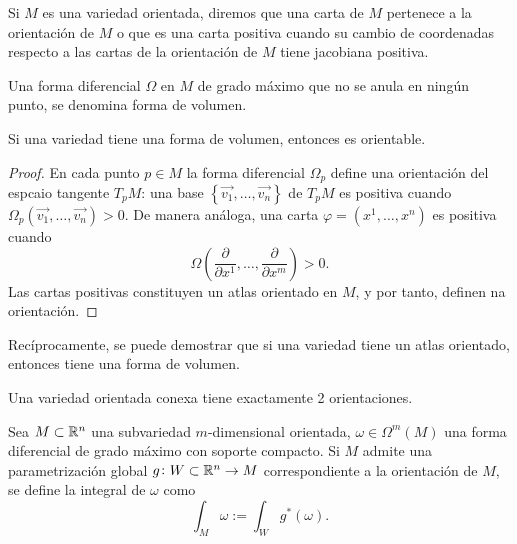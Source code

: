 \begin{defi}
    Si $M$ es una variedad orientada, diremos que una carta de $M$ pertenece a la orientación de $M$ o que es una carta positiva cuando su
    cambio de coordenadas respecto a las cartas de la orientación de $M$ tiene jacobiana positiva.
\end{defi}

\begin{defi}
    Una forma diferencial $\Omega$ en $M$ de grado máximo que no se anula en ningún punto, se denomina forma de volumen.
\end{defi}

\begin{prop}
    Si una variedad tiene una forma de volumen, entonces es orientable.
\end{prop}

\begin{proof}
    En cada punto $p \in M$ la forma diferencial $\Omega_p$ define una orientación del espcaio tangente $T_pM$:
    una base $\left\{ \vec{v_1}, \dots, \vec{v_n} \right\}$ de $T_pM$ es positiva cuando
    $\Omega_p\left( \vec{v_1}, \dots, \vec{v_n} \right) > 0$. De manera análoga, una carta $\varphi = \left( x^1, \dots, x^n \right)$
    es positiva cuando
    \[
        \Omega\left( \frac{\partial}{\partial x^1}, \dots, \frac{\partial}{\partial x^m} \right) > 0.
    \]
    Las cartas positivas constituyen un atlas orientado en $M$, y por tanto, definen na orientación.
\end{proof}

\begin{obs}
    Recíprocamente, se puede demostrar que si una variedad tiene un atlas orientado, entonces tiene una forma de volumen.
\end{obs}

\begin{obs}
    Una variedad orientada conexa tiene exactamente 2 orientaciones.
\end{obs}

\begin{defi}
    Sea $M \subset \mathbb{R}^n$ una subvariedad $m$-dimensional orientada, $\omega \in \Omega^m\left( M \right)$ una forma diferencial
    de grado máximo con soporte compacto. Si $M$ admite una parametrización global $g \colon W \subset \mathbb{R}^n \to M$ correspondiente
    a la orientación de $M$, se define la integral de $\omega$ como
    \[
        \int_M \omega := \int_W g^\ast(\omega).
    \]
\end{defi}

